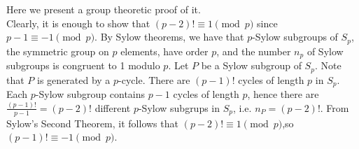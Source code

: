 \documentclass[12pt]{article}
\begin{document}
Here we present a group theoretic proof of it.
\\Clearly, it is enough to show that
$ (p-2)!\equiv 1\pmod{p}$ since $ p-1\equiv -1\pmod{p}$.
By Sylow theorems, we have that $p$-Sylow subgroups of $S_p$, the
symmetric group on $p$ elements, have order $p$, and the number $n_p$ of
Sylow subgroups is congruent to 1 modulo $p$. Let $P$ be a Sylow subgroup
of $S_p$. Note that $P$ is generated by a $p$-cycle. There are $(p-1)!$ cycles
of length $p$ in $S_p$. Each $p$-Sylow subgroup contains $p-1$ cycles
of length $p$, hence there are $\frac{(p-1)!}{p-1}=(p-2)!$ different
$p$-Sylow subgrups in $S_p$, i.e. $n_P=(p-2)!$. From Sylow's Second
Theorem, it follows that $(p-2)!\equiv1\pmod{p}$,so $(p-1)!\equiv-1\pmod{p}$.
\end{document}
